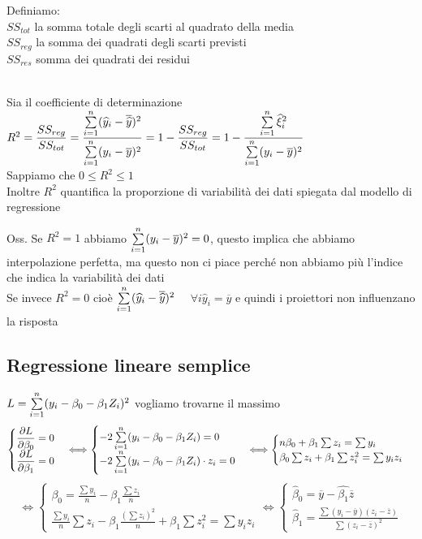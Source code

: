 Definiamo:\\
$SS_{tot}$ la somma totale degli scarti al quadrato della media\\
$SS_{reg}$ la somma dei quadrati degli scarti previsti\\
$SS_{res}$ somma dei quadrati dei residui\\ \\

\begin{defi}
Sia il coefficiente di determinazione \ \ $R^2=\dfrac{SS_{reg}}{SS_{tot}}= \dfrac{\sum\limits_{i=1}^{n} (\widehat{y}_i-\overline{\widehat{y}})^2}{\sum\limits_{i=1}^{n} (y_i-\overline{y})^2}= 1 - \dfrac{SS_{reg}}{SS_{tot}}= 1-  \dfrac{\sum\limits_{i=1}^{n} \widehat{\xi}_i^2}{\sum\limits_{i=1}^{n} (y_i-\overline{y})^2}$\\
Sappiamo che $0\le R^2 \le 1$\\
Inoltre $R^2$ quantifica la proporzione di variabilità dei dati spiegata dal modello di regressione
\end{defi}


Oss. Se $R^2=1$ abbiamo $\sum\limits_{i=1}^{n} (y_i-\overline{y})^2 =0$, questo implica che abbiamo interpolazione perfetta, ma questo non ci piace perché non abbiamo più l'indice che indica la variabilità dei dati\\
Se invece $R^2=0$ cioè $\sum\limits_{i=1}^{n} (\widehat{y}_i-\overline{\widehat{y}})^2$ \ \ $\forall i \hat{y}_i=\overline{y}$ e quindi i proiettori non influenzano la risposta\\



\subsection{Regressione lineare semplice}

$L=\sum\limits_{i=1}^{n}(y_i - \beta_0 -\beta_1 Z_i )^2$ vogliamo trovarne il massimo
\[
\begin{cases}
    \dfrac{\partial L}{\partial \beta_0}=0 \\
    \dfrac{\partial L}{\partial \beta_1}=0 
\end{cases} \Longleftrightarrow \begin{cases}
    -2\sum\limits_{i=1}^{n} (y_i-\beta_0-\beta_1Z_i)=0\\
    -2\sum\limits_{i=1}^{n} (y_i-\beta_0-\beta_1Z_i) \cdot z_i=0
\end{cases} \Longleftrightarrow \begin{cases}
    n\beta_0 + \beta_1 \sum z_i = \sum y_i\\
    \beta_0 \sum z_i + \beta_1 \sum z_i^2 = \sum y_i z_i
\end{cases}
\]
\[
\Longleftrightarrow \begin{cases}
    \beta_0 = \frac{\sum y_i}{n} - \beta_1 \frac{\sum z_i}{n}\\
    \frac{\sum y_i}{n} \sum z_i -\beta_1 \frac{(\sum z_i)^2}{n} + \beta_1 \sum z_i^2 = \sum y_i z_i
\end{cases} \Longleftrightarrow \begin{cases}
    \hat{\beta}_0=\overline{y} - \hat{\beta_1} \overline{z}\\
    \hat{\beta}_1 = \frac{\sum (y_i-\overline{y})(z_i-\overline{z})}{\sum (z_i-\overline{z})^2}
\end{cases}
\]

